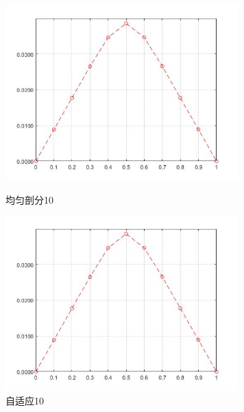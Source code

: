 \documentclass[12pt]{ctexart}
\begin{document}
\begin{figure}[H]
	\centering
	\begin{minipage}[t]{0.48\textwidth}
		\centering
		\includegraphics[width=9cm]{方程二，均匀剖分10.jpg}
		\caption{均匀剖分10}
	\end{minipage}
	\begin{minipage}[t]{0.48\textwidth}
		\centering
		\includegraphics[width=9cm]{方程二，自适应10.jpg}
		\caption{自适应10}
	\end{minipage}
\end{figure}
\end{document}
